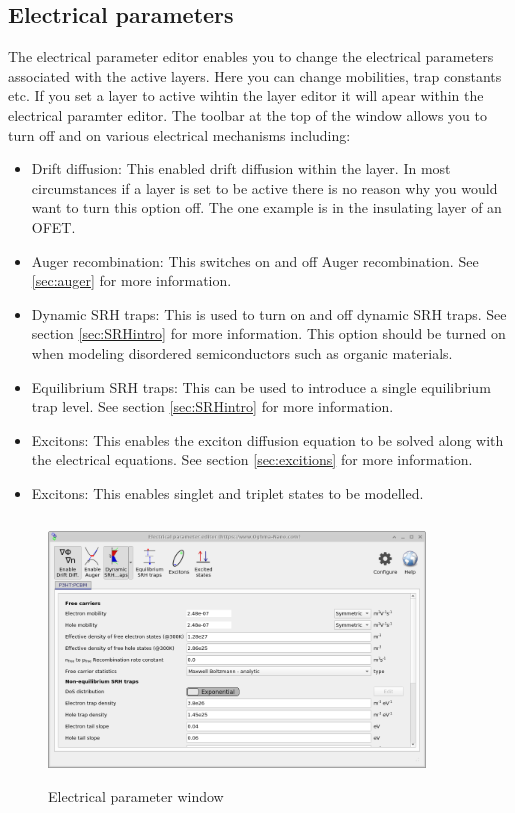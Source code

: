 \newpage
\subsection{Electrical parameters}
\label{sec:doseditor}
The electrical parameter editor enables you to change the electrical parameters associated with the active layers. Here you can change mobilities, trap constants etc. If you set a layer to active wihtin the layer editor it will apear within the electrical paramter editor. The toolbar at the top of the window allows you to turn off and on various electrical mechanisms including:

\begin{itemize}
  \item Drift diffusion: This enabled drift diffusion within the layer. In most circumstances if a layer is set to be active there is no reason why you would want to turn this option off. The one example is in the insulating layer of an OFET.
  \item Auger recombination: This switches on and off Auger recombination. See \ref{sec:auger} for more information.
  \item Dynamic SRH traps: This is used to turn on and off dynamic SRH traps.  See section \ref{sec:SRHintro} for more information. This option should be turned on when modeling disordered semiconductors such as organic materials.
  \item Equilibrium SRH traps: This can be used to introduce a single equilibrium trap level.  See section \ref{sec:SRHintro} for more information.
  \item Excitons: This enables the exciton diffusion equation to be solved along with the electrical equations. See section \ref{sec:excitions} for more information.
  \item Excitons: This enables singlet and triplet states to be modelled.
\end{itemize}

\begin{figure}[H]
\centering
\includegraphics[width=100mm,height=70mm]{./images/running/dos_editor.png}
\caption{Electrical parameter window}
\label{fig:electricalparamwindow}
\end{figure}

